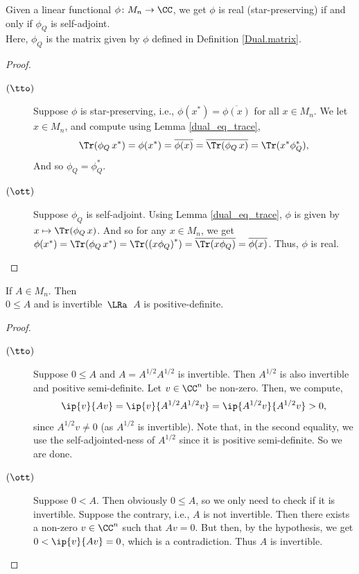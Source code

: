   \begin{proposition}\label{Dual.isReal_iff}\leanok
   Given a linear functional $\phi\colon{M_n}\to\CC$, we get $\phi$ is real (star-preserving) if and only if $\phi_Q$ is self-adjoint.\\
   Here, $\phi_Q$ is the matrix given by $\phi$ defined in Definition \ref{Dual.matrix}.
  \end{proposition}
  \begin{proof}\leanok {\ }
   \begin{description}
    \item[$(\tto)$]
     Suppose $\phi$ is star-preserving, i.e., $\phi(x^*)=\overline{\phi(x)}$ for all $x\in{M_n}$.
     We let $x\in{M_n}$, and compute using Lemma \ref{dual_eq_trace},
     \[\Tr(\phi_Q\, x^*)=\phi(x^*)=\overline{\phi(x)}=\overline{\Tr(\phi_Q\, x)}=\Tr(x^*\phi_Q^*),\]
     And so $\phi_Q=\phi_Q^*$.
    \item[$(\ott)$]
     Suppose $\phi_Q$ is self-adjoint. Using Lemma \ref{dual_eq_trace}, $\phi$ is given by $x\mapsto\Tr(\phi_Q\, x)$.
     And so for any $x\in{M_n}$, we get $\phi(x^*)=\Tr(\phi_Q\, x^*)=\Tr({(x\phi_Q)}^*)=\overline{\Tr(x\phi_Q)}=\overline{\phi(x)}$.
     Thus, $\phi$ is real.
   \end{description}
  \end{proof}

\begin{corollary}\label{Matrix.isPosSemidef_and_invertible_iff_isPosDef}\leanok
  If $A\in{M_n}$. Then\\
  \hspace*{0.5cm}$0\leq{A}$ and is invertible $\,\LRa\,$ $A$ is positive-definite.
 \end{corollary}
 \begin{proof}\leanok {\ }
  \begin{description}
   \item[$(\tto)$]
    Suppose $0\leq{A}$ and $A=A^{1/2}A^{1/2}$ is invertible. Then $A^{1/2}$ is also invertible and positive semi-definite. Let $v\in\CC^n$ be non-zero.
    Then, we compute,
    \[\ip{v}{Av}=\ip{v}{A^{1/2}A^{1/2}v}=\ip{A^{1/2}v}{A^{1/2}v}>0,\]
    since $A^{1/2}v\neq0$ (as $A^{1/2}$ is invertible). Note that, in the second equality, we use the self-adjointed-ness of $A^{1/2}$ since it is positive semi-definite. So we are done.
   \item[$(\ott)$]
    Suppose $0<A$. Then obviously $0\leq{A}$, so we only need to check if it is invertible. Suppose the contrary, i.e., $A$ is not invertible. Then there exists a non-zero $v\in\CC^n$ such that $Av=0$. But then, by the hypothesis, we get $0<\ip{v}{Av}=0$, which is a contradiction. Thus $A$ is invertible.
  \end{description}
 \end{proof}


